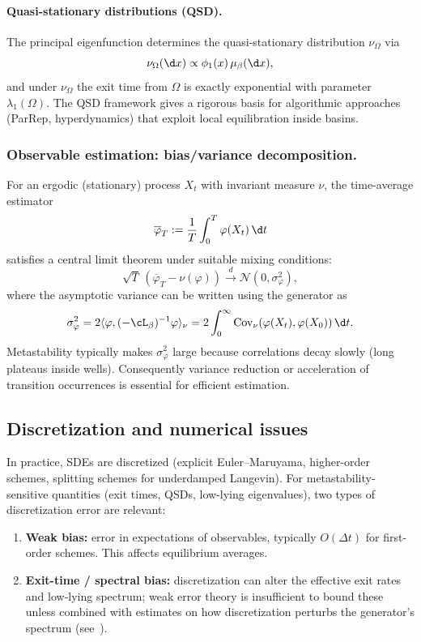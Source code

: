 \paragraph{Quasi-stationary distributions (QSD).} The principal eigenfunction determines the quasi-stationary distribution $\nu_\Omega$ via
\[
\nu_\Omega(\d x)\propto \phi_1(x)\,\mu_\beta(\d x),
\]
and under $\nu_\Omega$ the exit time from $\Omega$ is exactly exponential with parameter $\lambda_1(\Omega)$. The QSD framework gives a rigorous
basis for algorithmic approaches (ParRep, hyperdynamics) that exploit local equilibration inside basins.

\subsubsection*{Observable estimation: bias/variance decomposition.}
For an ergodic (stationary) process $X_t$ with invariant measure $\nu$, the time-average estimator
\[
\overline\varphi_T := \frac{1}{T}\int_0^T \varphi(X_t)\,\d t
\]
satisfies a central limit theorem under suitable mixing conditions:
\[
\sqrt{T}\,(\overline\varphi_T - \nu(\varphi)) \xrightarrow{d} \mathcal N(0,\sigma_\varphi^2),
\]
where the asymptotic variance can be written using the generator as
\begin{equation}\label{eq:asymptotic_variance}
    \sigma_\varphi^2 = 2\langle \varphi, (-\cL_\beta)^{-1} \varphi \rangle_{\nu} = 2\int_0^\infty \mathrm{Cov}_\nu(\varphi(X_t),\varphi(X_0))\,\d t.
\end{equation}
Metastability typically makes $\sigma_\varphi^2$ large because correlations decay slowly (long plateaus inside wells). Consequently variance reduction
or acceleration of transition occurrences is essential for efficient estimation.

\subsection{Discretization and numerical issues}

In practice, SDEs are discretized (explicit Euler--Maruyama, higher-order schemes, splitting schemes for underdamped Langevin). For metastability-sensitive
quantities (exit times, QSDs, low-lying eigenvalues), two types of discretization error are relevant:
\begin{enumerate}
    \item \textbf{Weak bias:} error in expectations of observables, typically $O(\Delta t)$ for first-order schemes. This affects equilibrium averages.
    \item \textbf{Exit-time / spectral bias:} discretization can alter the effective exit rates and low-lying spectrum; weak error theory is insufficient to bound these
    unless combined with estimates on how discretization perturbs the generator's spectrum (see~\cite{Lelievre2018,BouRabee2020}).
\end{enumerate}


